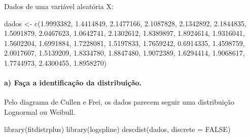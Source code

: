 \documentclass[
  letterpaper,
  DIV=11,
  numbers=noendperiod]{scrartcl}
\let\oldparagraph\paragraph
\renewcommand{\paragraph}[1]{\oldparagraph{#1}\mbox{}}
\newenvironment{Shaded}{\begin{snugshade}}{\end{snugshade}}
\newcommand{\AttributeTok}[1]{\textcolor[rgb]{0.40,0.45,0.13}{#1}}
\newcommand{\ConstantTok}[1]{\textcolor[rgb]{0.56,0.35,0.01}{#1}}
\newcommand{\FloatTok}[1]{\textcolor[rgb]{0.68,0.00,0.00}{#1}}
\newcommand{\FunctionTok}[1]{\textcolor[rgb]{0.28,0.35,0.67}{#1}}
\newcommand{\NormalTok}[1]{\textcolor[rgb]{0.00,0.23,0.31}{#1}}
\newcommand{\OtherTok}[1]{\textcolor[rgb]{0.00,0.23,0.31}{#1}}
\begin{document}
Dados de uma variável aleatória X:

\begin{Shaded}
\begin{Highlighting}[]
\NormalTok{dados }\OtherTok{\textless{}{-}} \FunctionTok{c}\NormalTok{(}\FloatTok{1.9993382}\NormalTok{, }\FloatTok{1.4414849}\NormalTok{, }\FloatTok{2.1477166}\NormalTok{, }\FloatTok{2.1087828}\NormalTok{, }\FloatTok{2.1342892}\NormalTok{, }\FloatTok{2.1844835}\NormalTok{, }\FloatTok{1.5091879}\NormalTok{, }\FloatTok{2.0467623}\NormalTok{, }\FloatTok{1.0642741}\NormalTok{, }\FloatTok{2.1302612}\NormalTok{, }\FloatTok{1.8389897}\NormalTok{, }\FloatTok{1.8924614}\NormalTok{, }\FloatTok{1.9316041}\NormalTok{, }\FloatTok{1.5602204}\NormalTok{, }\FloatTok{1.6991884}\NormalTok{, }\FloatTok{1.7228081}\NormalTok{, }\FloatTok{1.5197833}\NormalTok{, }\FloatTok{1.7659242}\NormalTok{, }\FloatTok{0.6914335}\NormalTok{, }\FloatTok{1.4598759}\NormalTok{, }\FloatTok{2.0017607}\NormalTok{, }\FloatTok{1.5139209}\NormalTok{, }\FloatTok{1.8334780}\NormalTok{, }\FloatTok{1.8847480}\NormalTok{, }\FloatTok{1.9072389}\NormalTok{, }\FloatTok{1.6294414}\NormalTok{, }\FloatTok{1.9068617}\NormalTok{, }\FloatTok{1.7744973}\NormalTok{, }\FloatTok{2.4300455}\NormalTok{, }\FloatTok{1.8958270}\NormalTok{)}
\end{Highlighting}
\end{Shaded}

\hypertarget{a-fauxe7a-a-identificauxe7uxe3o-da-distribuiuxe7uxe3o.}{%
\paragraph{a) Faça a identificação da
distribuição.}\label{a-fauxe7a-a-identificauxe7uxe3o-da-distribuiuxe7uxe3o.}}

Pelo diagrama de Cullen e Frei, os dados parecem seguir uma distribuição
Lognormal ou Weibull.

\begin{Shaded}
\begin{Highlighting}[]
\FunctionTok{library}\NormalTok{(fitdistrplus)}
\FunctionTok{library}\NormalTok{(logspline)}
\FunctionTok{descdist}\NormalTok{(dados, }\AttributeTok{discrete =} \ConstantTok{FALSE}\NormalTok{)}
\end{Highlighting}
\end{Shaded}
\end{document}
